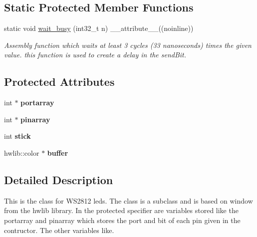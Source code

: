 \subsection*{Static Protected Member Functions}
\begin{DoxyCompactItemize}
\item 
static void \mbox{\hyperlink{class_new__ledsticklib_a6f3fff3b20ff9371b01c9181842aee97}{wait\+\_\+busy}} (int32\+\_\+t n) \+\_\+\+\_\+attribute\+\_\+\+\_\+((noinline))
\begin{DoxyCompactList}\small\item\em Assembly function which waits at least 3 cycles (33 nanoseconds) times the given value. this function is used to create a delay in the send\+Bit. \end{DoxyCompactList}\end{DoxyCompactItemize}
\subsection*{Protected Attributes}
\begin{DoxyCompactItemize}
\item 
\mbox{\label{class_new__ledsticklib_a525ac7b448521e4e7924d3e1ebd98371}} 
int $\ast$ {\bfseries portarray}
\item 
\mbox{\label{class_new__ledsticklib_aefce6fb15b336a340955749d83c85947}} 
int $\ast$ {\bfseries pinarray}
\item 
\mbox{\label{class_new__ledsticklib_a03f2df60807c903648a4b433a7da623d}} 
int {\bfseries stick}
\item 
\mbox{\label{class_new__ledsticklib_a74ba15d8aaa5de08215e0097eb8b90b2}} 
hwlib\+::color $\ast$ {\bfseries buffer}
\end{DoxyCompactItemize}


\subsection{Detailed Description}
This is the class for W\+S2812 leds. The class is a subclass and is based on window from the hwlib library. In the protected specifier are variables stored like the portarray and pinarray which stores the port and bit of each pin given in the contructor. The other variables like. 



